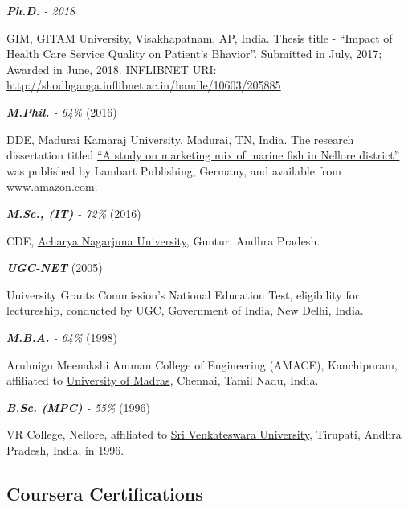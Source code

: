 \documentclass[10pt]{article}
\begin{document}
\begin{description}
\item \emph{\textbf{Ph.D.} - 2018} 

GIM, GITAM University, Visakhapatnam, AP, India. Thesis title - \enquote{Impact of Health Care Service Quality on Patient's Bhavior}. Submitted in July, 2017; Awarded in June, 2018. INFLIBNET URI: \url{http://shodhganga.inflibnet.ac.in/handle/10603/205885}

\item \emph{\textbf{M.Phil.} - 64\%} (2016)

DDE, Madurai Kamaraj University, Madurai, TN, India. The research dissertation titled \href{http://www.amazon.in/Study-Marketing-Marine-Nellore-District/dp/3659259721}{\enquote{A study on marketing mix of marine fish in Nellore district}} was published by Lambart Publishing, Germany, and available from \url{www.amazon.com}. 

\item \textit{\textbf{M.Sc., (IT)} - 72\%} (2016)

CDE, \href{http://www.nagarjunauniversity.ac.in/}{Acharya Nagarjuna University}, Guntur, Andhra Pradesh. 

\item \textit{\textbf{UGC-NET}} (2005) 

University Grants Commission's National Education Test, eligibility for lectureship, conducted by UGC, Government of India, New Delhi, India. 

\item \textit{\textbf{M.B.A.} - 64\%} (1998) 

Arulmigu Meenakshi Amman College of Engineering (AMACE), Kanchipuram, affiliated to \href{http://www.unom.ac.in/}{University of Madras}, Chennai, Tamil Nadu, India. 

\item \textit{\textbf{B.Sc. (MPC)} - 55\%} (1996) 

VR College, Nellore, affiliated to \href{http://svuniversity.ac.in/}{Sri Venkateswara University}, Tirupati, Andhra Pradesh, India, in 1996. 

\end{description}


\subsection{Coursera Certifications}
\end{document}
